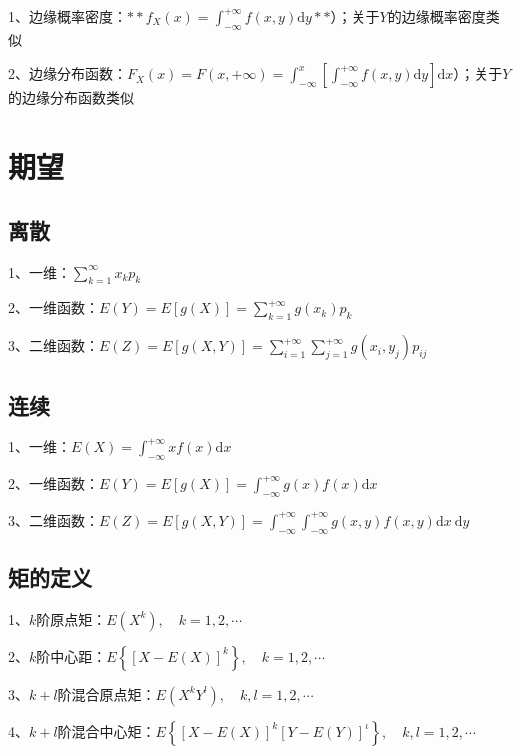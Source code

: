 1、边缘概率密度：$ **f_{X}(x)=\int_{-\infty}^{+\infty} f(x, y) \mathrm{d} y** $）；关于$ Y $的边缘概率密度类似

2、边缘分布函数：$ F_{X}(x)=F(x,+\infty)=\int_{-\infty}^{x}\left[\int_{-\infty}^{+\infty} f(x, y) \mathrm{d} y\right] \mathrm{d} x $）；关于$ Y $的边缘分布函数类似

\section{期望}



\subsection{离散}

1、一维：$ \sum_{k=1}^{\infty}x_kp_k $

2、一维函数：$ E(Y)=E[g(X)]=\sum_{k=1}^{+\infty} g\left(x_{k}\right) p_{k} $

3、二维函数：$ E(Z)=E[g(X, Y)]=\sum_{i=1}^{+\infty} \sum_{j=1}^{+\infty} g\left(x_{i}, y_{j}\right) p_{i j} $



\subsection{连续}

1、一维：$ E(X)=\int_{-\infty}^{+\infty} x f(x) \mathrm{d} x $

2、一维函数：$ E(Y)=E[g(X)]=\int_{-\infty}^{+\infty} g(x) f(x) \mathrm{d} x $

3、二维函数：$ E(Z)=E[g(X, Y)]=\int_{-\infty}^{+\infty} \int_{-\infty}^{+\infty} g(x, y) f(x, y) \mathrm{d} x \mathrm{~d} y $



\subsection{矩的定义}

1、$ k $阶原点矩：$ E\left(X^{k}\right), \quad k=1,2, \cdots  $

2、$ k $阶中心距：$ E\left\{[X-E(X)]^{k}\right\}, \quad k=1,2, \cdots $

3、$ k+l $阶混合原点矩：$ E\left(X^{k} Y^{l}\right), \quad k, l=1,2, \cdots $

4、$ k+l $阶混合中心矩：$ E\left\{[X-E(X)]^{k}[Y-E(Y)]^{\iota}\right\}, \quad k, l=1,2, \cdots $



